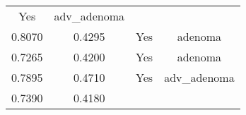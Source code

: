 \documentclass[12pt,]{article}
\begin{document}
\begin{longtable}[]{@{}cccc@{}}
\begin{minipage}[t]{0.22\columnwidth}
Yes\strut
\end{minipage} & \begin{minipage}[t]{0.16\columnwidth}\centering\strut
adv\_adenoma\strut
\end{minipage}\tabularnewline
\begin{minipage}[t]{0.24\columnwidth}\centering\strut
0.8070\strut
\end{minipage} & \begin{minipage}[t]{0.26\columnwidth}\centering\strut
0.4295\strut
\end{minipage} & \begin{minipage}[t]{0.22\columnwidth}\centering\strut
Yes\strut
\end{minipage} & \begin{minipage}[t]{0.16\columnwidth}\centering\strut
adenoma\strut
\end{minipage}\tabularnewline
\begin{minipage}[t]{0.24\columnwidth}\centering\strut
0.7265\strut
\end{minipage} & \begin{minipage}[t]{0.26\columnwidth}\centering\strut
0.4200\strut
\end{minipage} & \begin{minipage}[t]{0.22\columnwidth}\centering\strut
Yes\strut
\end{minipage} & \begin{minipage}[t]{0.16\columnwidth}\centering\strut
adenoma\strut
\end{minipage}\tabularnewline
\begin{minipage}[t]{0.24\columnwidth}\centering\strut
0.7895\strut
\end{minipage} & \begin{minipage}[t]{0.26\columnwidth}\centering\strut
0.4710\strut
\end{minipage} & \begin{minipage}[t]{0.22\columnwidth}\centering\strut
Yes\strut
\end{minipage} & \begin{minipage}[t]{0.16\columnwidth}\centering\strut
adv\_adenoma\strut
\end{minipage}\tabularnewline
\begin{minipage}[t]{0.24\columnwidth}\centering\strut
0.7390\strut
\end{minipage} & \begin{minipage}[t]{0.26\columnwidth}\centering\strut
0.4180\strut
\end{minipage} & \begin{minipage}[t]{0.22\columnwidth}\centering\strut

\end{minipage}
\end{longtable}
\end{document}
